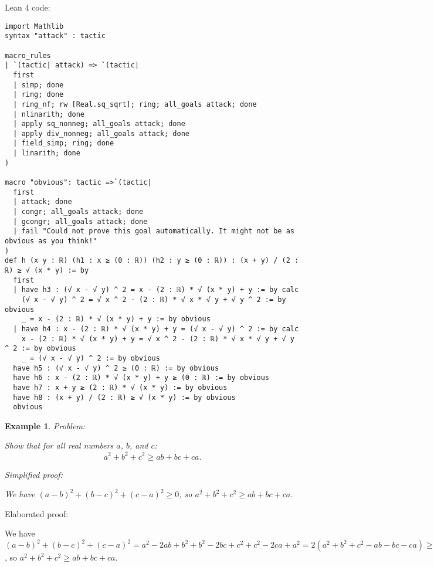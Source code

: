 \documentclass{article}
\newtheorem{example}{Example}
\begin{document}
Lean 4 code:
\begin{tcolorbox}[colback=white!10, width=\linewidth]
\begin{lstlisting}[language=Lean4]
import Mathlib
syntax "attack" : tactic

macro_rules
| `(tactic| attack) => `(tactic|
  first
  | simp; done
  | ring; done
  | ring_nf; rw [Real.sq_sqrt]; ring; all_goals attack; done
  | nlinarith; done
  | apply sq_nonneg; all_goals attack; done
  | apply div_nonneg; all_goals attack; done
  | field_simp; ring; done
  | linarith; done
)

macro "obvious": tactic =>`(tactic|
  first
  | attack; done
  | congr; all_goals attack; done
  | gcongr; all_goals attack; done
  | fail "Could not prove this goal automatically. It might not be as obvious as you think!"
)
def h (x y : ℝ) (h1 : x ≥ (0 : ℝ)) (h2 : y ≥ (0 : ℝ)) : (x + y) / (2 : ℝ) ≥ √ (x * y) := by
  first
  | have h3 : (√ x - √ y) ^ 2 = x - (2 : ℝ) * √ (x * y) + y := by calc
    (√ x - √ y) ^ 2 = √ x ^ 2 - (2 : ℝ) * √ x * √ y + √ y ^ 2 := by obvious
    _ = x - (2 : ℝ) * √ (x * y) + y := by obvious
  | have h4 : x - (2 : ℝ) * √ (x * y) + y = (√ x - √ y) ^ 2 := by calc
    x - (2 : ℝ) * √ (x * y) + y = √ x ^ 2 - (2 : ℝ) * √ x * √ y + √ y ^ 2 := by obvious
    _ = (√ x - √ y) ^ 2 := by obvious
  have h5 : (√ x - √ y) ^ 2 ≥ (0 : ℝ) := by obvious
  have h6 : x - (2 : ℝ) * √ (x * y) + y ≥ (0 : ℝ) := by obvious
  have h7 : x + y ≥ (2 : ℝ) * √ (x * y) := by obvious
  have h8 : (x + y) / (2 : ℝ) ≥ √ (x * y) := by obvious
  obvious

\end{lstlisting}
\end{tcolorbox}


\begin{example}
Problem:
\begin{tcolorbox}[colback=yellow!10, width=\linewidth]
Show that for all real numbers $a$, $b$, and $c$:
    $$a^2 + b^2 + c^2 \geq ab + bc + ca.$$
\end{tcolorbox}

Simplified proof:
\begin{tcolorbox}[colback=blue!10, width=\linewidth]
We have $(a-b)^2+(b-c)^2+(c-a)^2 \ge 0$, so $a^2+b^2+c^2 \ge ab+bc+ca$.
\end{tcolorbox}
\end{example}

Elaborated proof:
\begin{tcolorbox}[colback=green!10, width=\linewidth]
We have $(a-b)^2+(b-c)^2+(c-a)^2 = a^2 - 2ab + b^2 + b^2 - 2bc + c^2 + c^2 - 2ca + a^2 = 2(a^2+b^2+c^2 - ab - bc - ca) \ge 0$, so $a^2+b^2+c^2 \ge ab+bc+ca$.
\end{tcolorbox}
\end{document}

